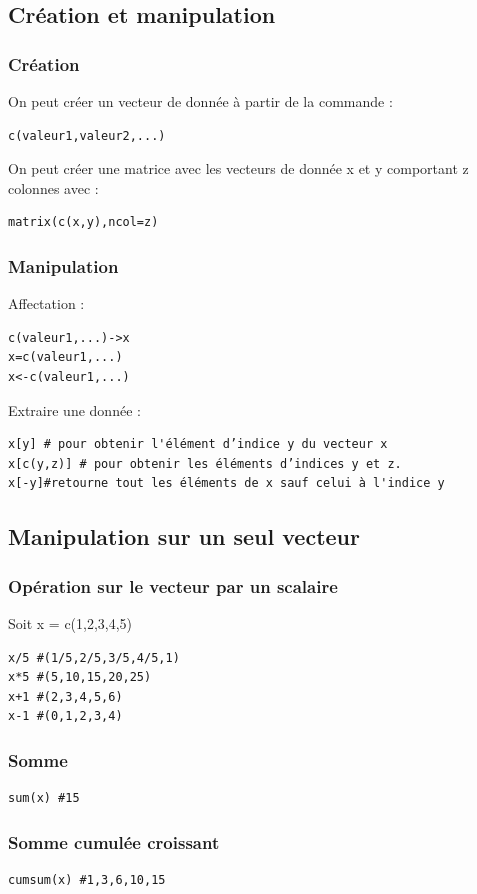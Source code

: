 \documentclass{article}
\begin{document}
\subsection{Création et manipulation}
\subsubsection{Création}
On peut créer un vecteur de donnée à partir de la commande  :
\begin{verbatim}
c(valeur1,valeur2,...)
\end{verbatim}
On peut créer une matrice avec les vecteurs de donnée x et y comportant z colonnes avec : 
\begin{verbatim}
matrix(c(x,y),ncol=z)
\end{verbatim}

\subsubsection{Manipulation}
Affectation : 
\begin{verbatim}
c(valeur1,...)->x
x=c(valeur1,...)
x<-c(valeur1,...)
\end{verbatim}
Extraire une donnée : 
\begin{verbatim}
x[y] # pour obtenir l'élément d’indice y du vecteur x 
x[c(y,z)] # pour obtenir les éléments d’indices y et z.
x[-y]#retourne tout les éléments de x sauf celui à l'indice y
\end{verbatim}

\subsection{Manipulation sur un seul vecteur}
\subsubsection{Opération sur le vecteur par un scalaire}
Soit x = c(1,2,3,4,5)
\begin{verbatim}
x/5 #(1/5,2/5,3/5,4/5,1)
x*5 #(5,10,15,20,25)
x+1 #(2,3,4,5,6)
x-1 #(0,1,2,3,4)
\end{verbatim}
\subsubsection{Somme}
\begin{verbatim}
sum(x) #15
\end{verbatim}
\subsubsection{Somme cumulée croissant}
\begin{verbatim}
cumsum(x) #1,3,6,10,15
\end{verbatim}
\end{document}
